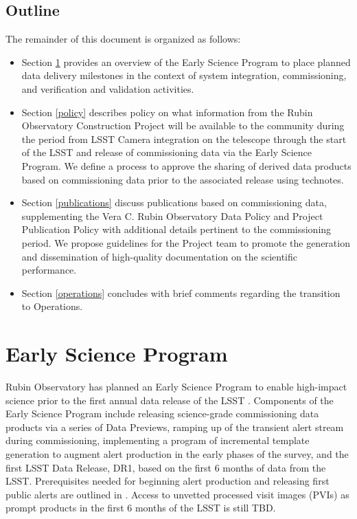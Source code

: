 \documentclass[SE,authoryear,toc,lsstdraft]{lsstdoc}
\begin{document}
\subsection{Outline}

The remainder of this document is organized as follows:

\begin{itemize}

  \item Section \ref{early_science} provides an overview of the Early Science Program to place planned data delivery milestones in the context of system integration, commissioning, and verification and validation activities.

  \item Section \ref{policy} describes policy on what information from the Rubin Observatory Construction Project will be available to the community during the period from LSST Camera integration on the telescope through the start of the LSST and release of commissioning data via the Early Science Program.
  We define a process to approve the sharing of derived data products based on commissioning data prior to the associated release using technotes.

  \item Section \ref{publications} discuss publications based on commissioning data, supplementing the Vera C. Rubin Observatory Data Policy  and Project Publication Policy \citep{LPM-162} with additional details pertinent to the commissioning period.
  We propose guidelines for the Project team to promote the generation and dissemination of high-quality documentation on the scientific performance.

  \item Section \ref{operations} concludes with brief comments regarding the transition to Operations.

\end{itemize}

\section{Early Science Program}
\label{early_science}

Rubin Observatory has planned an Early Science Program to enable high-impact science prior to the first annual data release of the LSST .
Components of the Early Science Program include releasing science-grade commissioning data products via a series of Data Previews, ramping up of the transient alert stream during commissioning, implementing a program of incremental template generation to augment alert production in the early phases of the survey, and the first LSST Data Release, DR1, based on the first 6 months of data from the LSST.
Prerequisites needed for beginning alert production and releasing first public alerts are outlined in .
Access to unvetted processed visit images (PVIs) as prompt products in the first 6 months of the LSST is still TBD.
\end{document}

